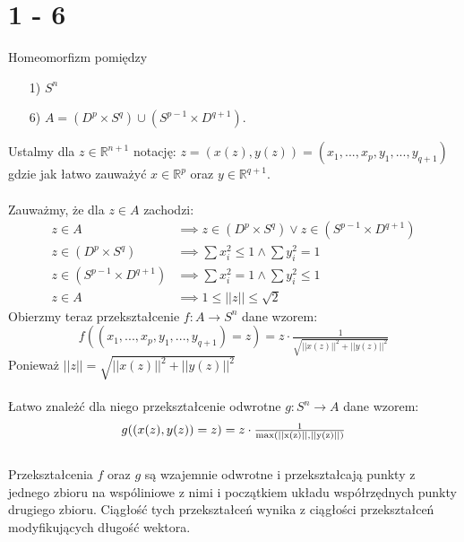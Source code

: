\section*{1 - 6}
Homeomorfizm pomiędzy
\begin{itemize}
  \item[1)] $ S^n $
  \item[6)] $A = (D^p \times S^q) \cup (S^{p-1} \times D^{q+1})$. \\
\end{itemize}
Ustalmy dla $ z \in \mathbb{R}^{n+1}$ notację: $  z = (x(z), y(z)) = (x_1, ..., x_p, y_1, ..., y_{q+1}) $ gdzie jak łatwo zauważyć $x \in \mathbb{R}^p$ oraz $y \in \mathbb{R}^{q+1} $. \\
\\
Zauważmy, że dla $z \in A$ zachodzi:
\begin{align*}
  z \in A & \implies z \in (D^p \times S^q) \lor z \in (S^{p-1} \times D^{q+1}) \\
  z \in (D^p \times S^q) & \implies \sum x_i^2 \leq 1 \land \sum y_i^2 = 1 \\
  z \in (S^{p-1} \times D^{q+1}) & \implies \sum x_i^2 = 1 \land \sum y_i^2 \leq 1 \\
  z \in A & \implies 1 \leq ||z|| \leq \sqrt{2}
\end{align*}
Obierzmy teraz przekształcenie $ f : A \to S^n $ dane wzorem:
\begin{equation*}
  f((x_1, ..., x_p, y_1, ..., y_{q+1}) = z) = z \cdot \tfrac{1}{\sqrt{||x(z)||^2 + ||y(z)||^2}}
\end{equation*}
Ponieważ $ ||z|| = \sqrt{||x(z)||^2 + ||y(z)||^2} $\\
\\
Łatwo znależć dla niego przekształcenie odwrotne $ g : S^n \to A $ dane wzorem:
\begin{equation*}
  g((x(z), y(z)) = z) = z \cdot \tfrac{1}{\rm max(||x(z)||, ||y(z)||)}
\end{equation*}
\\
Przekształcenia $f$ oraz $g$ są wzajemnie odwrotne i przekształcają punkty z jednego zbioru na wspóliniowe z nimi i początkiem układu współrzędnych punkty drugiego zbioru. Ciągłość tych przekształceń wynika z ciągłości przekształceń modyfikujących długość wektora.
